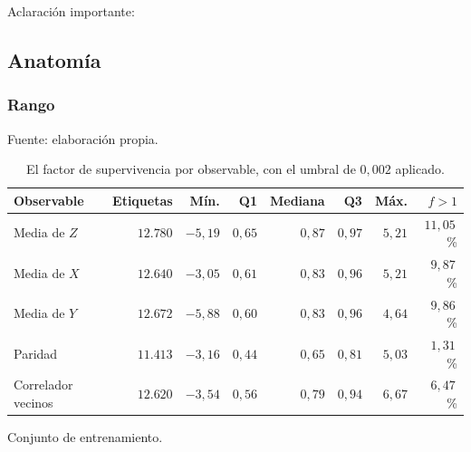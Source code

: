 Aclaración importante: 

\begin{center} 
\end{center}


\subsection{Anatomía}
\label{sec:anatomia}

\subsubsection{Rango}
\label{sec:rango}

\begin{table}[htbp]
    \centering
    \caption{El factor de supervivencia por observable, con el umbral de $0{,}002$ aplicado.}
    \label{tab:anatomia}
    {\footnotesize
    Fuente: elaboración propia. \begin{tabular}{@{}lrrrrrrr@{}}
        \toprule
        \textbf{Observable} & \textbf{Etiquetas} & \textbf{Mín.} & \textbf{Q1}
            & \textbf{Mediana} & \textbf{Q3} & \textbf{Máx.} & \textbf{$f>1$} \\
        \midrule
        Media de $Z$        & $12{.}780$ & $-5{,}19$ & $0{,}65$ & $0{,}87$ & $0{,}97$ & $5{,}21$ & $11{,}05$\,\% \\
        Media de $X$        & $12{.}640$ & $-3{,}05$ & $0{,}61$ & $0{,}83$ & $0{,}96$ & $5{,}21$ & $9{,}87$\,\% \\
        Media de $Y$        & $12{.}672$ & $-5{,}88$ & $0{,}60$ & $0{,}83$ & $0{,}96$ & $4{,}64$ & $9{,}86$\,\% \\
        Paridad             & $11{.}413$ & $-3{,}16$ & $0{,}44$ & $0{,}65$ & $0{,}81$ & $5{,}03$ & $1{,}31$\,\% \\
        Correlador vecinos  & $12{.}620$ & $-3{,}54$ & $0{,}56$ & $0{,}79$ & $0{,}94$ & $6{,}67$ & $6{,}47$\,\% \\
        \bottomrule
    \end{tabular}}

    {\footnotesize Conjunto de entrenamiento.}
\end{table}

